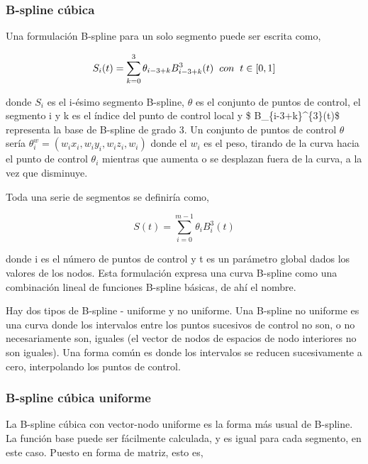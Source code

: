 \documentclass[
  12pt,
]{krantz}
\begin{document}
\hypertarget{b-spline-cubica}{%
\subsubsection{B-spline cúbica}\label{b-spline-cubica}}

Una formulación B-spline para un solo segmento puede ser escrita como,

\[\displaystyle{S_{i}(t) = \sum_{k=0}^{3} \theta_{i-3+k} B_{i-3+k}^{3}(t) \hspace{0.2cm} con \hspace{0.2cm} t \in [0,1]  }\]

donde \(S_{i}\) es el i-ésimo segmento B-spline, \(\theta\) es el conjunto de puntos de control, el segmento i y k es el índice del punto de control local y \$ B\_\{i-3+k\}\^{}\{3\}(t)\$ representa la base de B-spline de grado 3. Un conjunto de puntos de control \(\theta\) sería \({\displaystyle \theta_{i}^{w}=(w_{i}x_{i},w_{i}y_{i},w_{i}z_{i},w_{i})}\) donde el \({\displaystyle w_{i}}\) es el peso, tirando de la curva hacia el punto de control \({\displaystyle \theta_{i}}\) mientras que aumenta o se desplazan fuera de la curva, a la vez que disminuye.

Toda una serie de segmentos se definiría como,

\[\displaystyle{S(t) = \sum_{i=0}^{m-1} \theta_{i} B_{i}^{3}(t)  }\]

donde i es el número de puntos de control y t es un parámetro global dados los valores de los nodos. Esta formulación expresa una curva B-spline como una combinación lineal de funciones B-spline básicas, de ahí el nombre.

Hay dos tipos de B-spline - uniforme y no uniforme. Una B-spline no uniforme es una curva donde los intervalos entre los puntos sucesivos de control no son, o no necesariamente son, iguales (el vector de nodos de espacios de nodo interiores no son iguales). Una forma común es donde los intervalos se reducen sucesivamente a cero, interpolando los puntos de control.

\hypertarget{b-spline-cubica-uniforme}{%
\subsubsection{B-spline cúbica uniforme}\label{b-spline-cubica-uniforme}}

La B-spline cúbica con vector-nodo uniforme es la forma más usual de B-spline. La función base puede ser fácilmente calculada, y es igual para cada segmento, en este caso. Puesto en forma de matriz, esto es,
\end{document}

